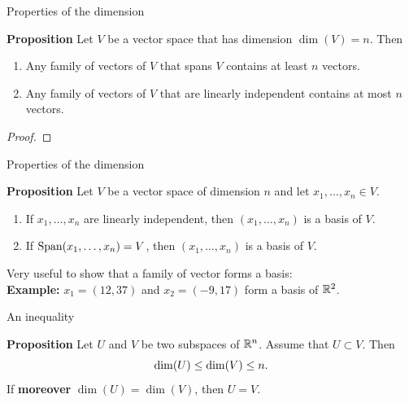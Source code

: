 \documentclass{beamer}
\begin{document}
\begin{frame}[t]{Properties of the dimension}
	\grid
	\vspace{-0.4cm}
	\begin{block}{\bf Proposition}
		Let $V$ be a vector space that has dimension $\dim(V) = n$. Then
		\begin{enumerate}
			\item Any family of vectors of $V$ that spans $V$ contains at least $n$ vectors.
			\item Any family of vectors of $V$ that are linearly independent contains at most $n$ vectors.
		\end{enumerate}
	\end{block}
	\begin{proof}
		\vspace{3cm}
		\vfill
	\end{proof}
	\pause
\end{frame}


\begin{frame}[t]{Properties of the dimension}
	\grid
	\vspace{-0.3cm}
	\begin{block}{\bf Proposition}
		Let $V$ be a vector space of dimension $n$ and let $x_1, \dots, x_n \in V$.
		\begin{enumerate}
			\item If $x_1, \dots, x_n$ are linearly independent, then $(x_1, \dots, x_n)$ is a basis of $V$.
			\item If ${{\rm Span}}(x_1, \dots, x_n) = V$, then $(x_1, \dots, x_n)$ is a basis of $V$.
		\end{enumerate}
	\end{block}

	\vspace{0.3cm}

	Very useful to show that a family of vector forms a basis:
	\\
	\vspace{0.3cm}
	\textbf{Example:} $x_1 = (12,37)$ and $x_2 = (-9,17)$ form a basis of $\mathbb{R}^2$.

\end{frame}

\begin{frame}[t]{An inequality}
	\grid
	\vspace{-0.4cm}
	\begin{block}{\bf Proposition}
		Let	$U$ and $V$ be two subspaces of $\mathbb{R}^n$. Assume that $U \subset V$. Then
	\vspace{-0.2cm}
		$$
		\dim(U) \leq \dim(V) \leq n.
	\vspace{-0.2cm}
		$$
		If \textbf{moreover} $\dim(U) = \dim(V)$, then $U = V$.
	\end{block}
\end{frame}
\end{document}
